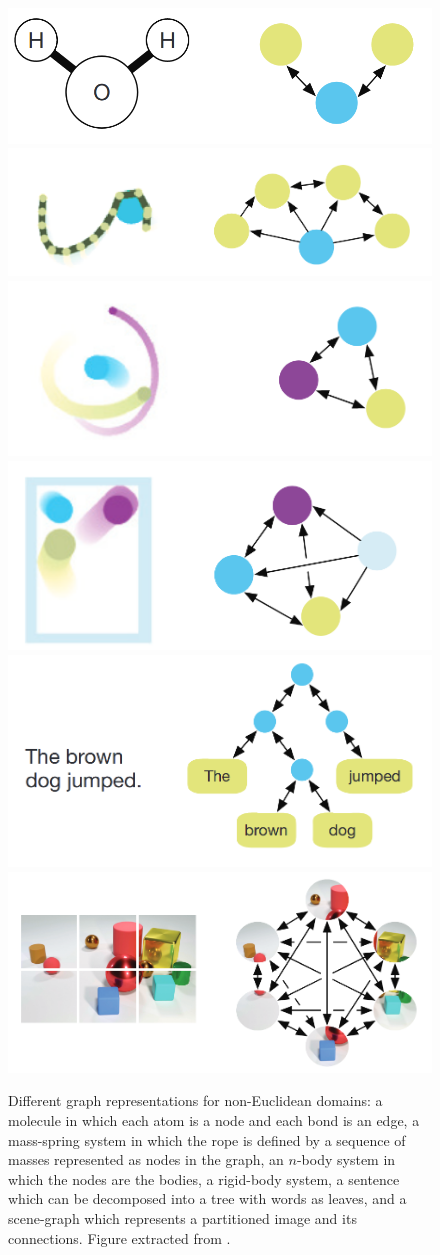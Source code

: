 \begin{figure}[!thb]
    \centering
    \includegraphics[width=0.49\linewidth]{Figures/Tactile/molecule.png}
    \includegraphics[width=0.49\linewidth]{Figures/Tactile/mass-spring.png}
    \includegraphics[width=0.49\linewidth]{Figures/Tactile/n-body.png}
    \includegraphics[width=0.49\linewidth]{Figures/Tactile/rigid-body.png}
    \includegraphics[width=0.49\linewidth]{Figures/Tactile/sentence.png}
    \includegraphics[width=0.49\linewidth]{Figures/Tactile/scene.png}
    \caption{Different graph representations for non-Euclidean domains: a molecule in which each atom is a node and each bond is an edge, a mass-spring system in which the rope is defined by a sequence of masses represented as nodes in the graph, an $n$-body system in which the nodes are the bodies, a rigid-body system, a sentence which can be decomposed into a tree with words as leaves, and a scene-graph which represents a partitioned image and its connections. Figure extracted from \cite{Battaglia2018}.}
    \label{fig:tactile:graph_applications}
\end{figure}


